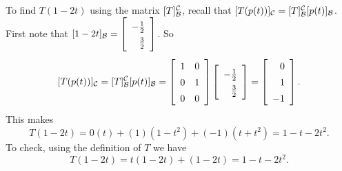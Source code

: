 \begin{example}
\item To find $T(1-2t)$ using the matrix $[T]_{\mathcal{B}}^{\mathcal{C}}$, recall that $[T(p(t))]_{\mathcal{C}} = [T]_{\mathcal{B}}^{\mathcal{C}}[p(t)]_{\mathcal{B}}$. First note that $[1-2t]_{\CB} = \left[\renewcommand{\arraystretch}{1.4} \begin{array}{r} -\frac{1}{2} \\ \frac{3}{2} \end{array} \right]$. So 
\[[T(p(t))]_{\CC} =  [T]_{\CB}^{\CC}[p(t)]_{\CB} = \left[ \begin{array}{cc} 1&0\\0&1\\0&0 \end{array} \right] \left[\renewcommand{\arraystretch}{1.4} \begin{array}{r} -\frac{1}{2} \\ \frac{3}{2} \end{array} \right] = \left[ \begin{array}{r} 0 \\ 1 \\ -1 \end{array} \right].\]
This makes 
\[T(1-2t) = 0(t) + (1)\left(1-t^2\right) + (-1)\left(t+t^2\right) = 1-t-2t^2.\]
To check, using the definition of $T$ we have 
\[T(1-2t) = t(1-2t) + (1-2t) = 1-t-2t^2.\]

\ea

\end{example}


